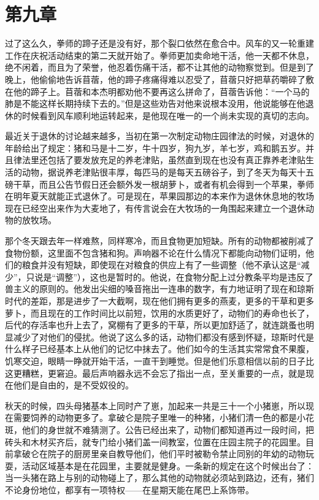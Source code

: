\chapter{第九章}

过了这么久，拳师的蹄子还是没有好，那个裂口依然在愈合中。风车的又一轮重建工作在庆祝活动结束的第二天就开始了。拳师更加卖命地干活，他一天都不休息，绝不闲着，而且为了荣誉，他忍着伤痛干活，都不让其他的动物察觉到。但是到了晚上，他偷偷地告诉苜蓿，他的蹄子疼痛得难以忍受了，苜蓿只好把草药嚼碎了敷在他的蹄子上。苜蓿和本杰明都劝他不要再这么拼命了，苜蓿告诉他：“一个马的肺是不能这样长期持续下去的。”但是这些劝告对他来说根本没用，他说能够在他退休的时候看到风车顺利地运转起来，是他现在唯一的一个尚未实现的真切的志向。

最近关于退休的讨论越来越多，当初在第一次制定动物庄园律法的时候，对退休的年龄给出了规定：猪和马是十二岁，牛十四岁，狗九岁，羊七岁，鸡和鹅五岁。并且律法里还包括了要发放充足的养老津贴，虽然直到现在也没有真正靠养老津贴生活的动物，据说养老津贴很丰厚，每匹马的是每天五磅谷子，到了冬天为每天十五磅干草，而且公告节假日还会额外发一根胡萝卜，或者有机会得到一个苹果，拳师在明年夏天就能正式退休了。可是现在，苹果园那边的本来作为退休休息地的牧场现在已经空出来作为大麦地了，有传言说会在大牧场的一角围起来建立一个退休动物的放牧场。

那个冬天跟去年一样难熬，同样寒冷，而且食物更加短缺。所有的动物都被削减了食物份额，这里面不包含猪和狗。声响器不论在什么情况下都能向动物们证明，他们的粮食并没有短缺，即使现在对粮食的供应上有了一些调整（他不承认这是“减少”，只说是“调整”），这也是暂时的。他说，在食物分配上过分教条平均是违反了兽主义的原则的。他发出尖细的嗓音拖出一连串的数字，有力地证明了现在和琼斯时代的差距，那是进步了一大截啊，现在他们拥有更多的燕麦，更多的干草和更多萝卜，而且现在的工作时间比以前短，饮用的水质更好了，动物们的寿命也长了，后代的存活率也升上去了，窝棚有了更多的干草，所以更加舒适了，就连跳蚤也明显减少了对他们的侵扰。他说了这么多的话，动物们都没有感到怀疑，琼斯时代是什么样子已经基本上从他们的记忆中抹去了。他们如今的生活其实常常食不果腹，饥寒交迫，眼睛一睁就开始干活，一直干到睡觉。但是他们乐意相信以前的日子比这更糟糕，更窘迫。最后声响器永远不会忘了指出一点，至关重要的一点，就是现在他们是自由的，是不受奴役的。

秋天的时候，四头母猪基本上同时产了崽，加起来一共是三十一个小猪崽，所以现在需要饲养的动物更多了。拿破仑是院子里唯一的种猪，小猪们清一色的都是小花斑，他们的身世就不难猜测了。公告已经出来了，动物们都知道再过一段时间，把砖头和木材买齐后，就专门给小猪们盖一间教室，位置在庄园主院子的花园里。目前拿破仑在院子的厨房里亲自教导他们，他们平时被勒令禁止同别的年幼的动物玩耍，活动区域基本是在花园里，主要就是健身。一条新的规定在这个时候出台了：当一头猪在路上与别的动物碰上了，那么其他的动物就必须站到路边，还有，猪们不论身份地位，都享有一项特权——在星期天能在尾巴上系饰带。


